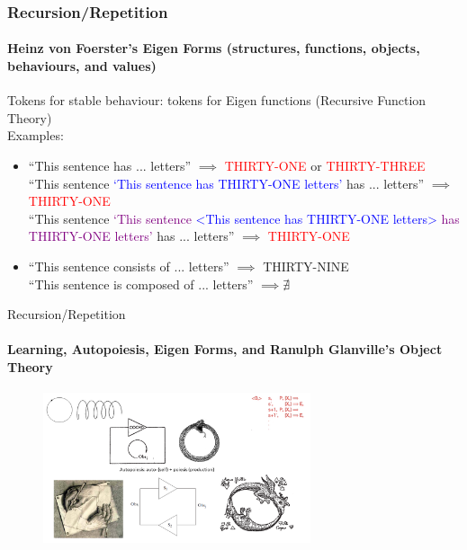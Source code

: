 \documentclass[
	11pt,
	aspectratio=169,
]{beamer}
\begin{document}
                \begin{frame}
                    \frametitle{Recursion/Repetition}
                    \framesubtitle{Heinz von Foerster's Eigen Forms (structures, functions, objects, behaviours, and values)}
                    Tokens for stable behaviour: tokens for Eigen functions (Recursive Function Theory)\\
                    Examples:
                    \begin{itemize}
                        \item<1-> ``This sentence has ... letters'' $\implies$ \textcolor{red}{THIRTY-ONE} or \textcolor{red}{THIRTY-THREE}\\
                        ``This sentence \textcolor{blue}{`This sentence has THIRTY-ONE letters'} has ... letters'' $\implies$ \textcolor{red}{THIRTY-ONE}\\
                        ``This sentence \textcolor{purple}{`This sentence \textcolor{blue}{<This sentence has THIRTY-ONE letters>} has THIRTY-ONE letters'} has ... letters'' $\implies$ \textcolor{red}{THIRTY-ONE} \\
                        \vspace{0.7cm}
                        \item<2-> ``This sentence consists of ... letters'' $\implies$ THIRTY-NINE \\
                        ``This sentence is composed of ... letters'' $\implies \nexists$
                    \end{itemize}
                \end{frame}
                \begin{frame}{Recursion/Repetition}
                    \framesubtitle{Learning, Autopoiesis, Eigen Forms, and Ranulph Glanville's Object Theory}
                    \begin{figure}
                        \centering\includegraphics[width=0.7\textwidth]{resources/recursion.png}
                    \end{figure}
                \end{frame}
\end{document}
